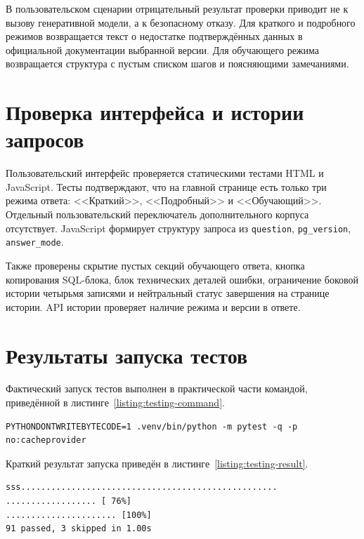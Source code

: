 В пользовательском сценарии отрицательный результат проверки приводит не к вызову генеративной модели, а к безопасному отказу. Для краткого и подробного режимов возвращается текст о недостатке подтверждённых данных в официальной документации выбранной версии. Для обучающего режима возвращается структура с пустым списком шагов и поясняющими замечаниями.

\section{Проверка интерфейса и истории запросов}

Пользовательский интерфейс проверяется статическими тестами HTML и JavaScript. Тесты подтверждают, что на главной странице есть только три режима ответа: <<Краткий>>, <<Подробный>> и <<Обучающий>>. Отдельный пользовательский переключатель дополнительного корпуса отсутствует. JavaScript формирует структуру запроса из \texttt{question}, \texttt{pg\_version}, \texttt{answer\_mode}.

Также проверены скрытие пустых секций обучающего ответа, кнопка копирования SQL-блока, блок технических деталей ошибки, ограничение боковой истории четырьмя записями и нейтральный статус завершения на странице истории. API истории проверяет наличие режима и версии в ответе.

\section{Результаты запуска тестов}

Фактический запуск тестов выполнен в практической части командой, приведённой в листинге~\ref{listing:testing-command}.

\begin{listingblock}
\label{listing:testing-command}
\begin{verbatim}
PYTHONDONTWRITEBYTECODE=1 .venv/bin/python -m pytest -q -p no:cacheprovider
\end{verbatim}
\end{listingblock}

Краткий результат запуска приведён в листинге~\ref{listing:testing-result}.

\begin{listingblock}
\label{listing:testing-result}
\begin{verbatim}
sss...................................................
.................. [ 76%]
...................... [100%]
91 passed, 3 skipped in 1.00s
\end{verbatim}
\end{listingblock}

